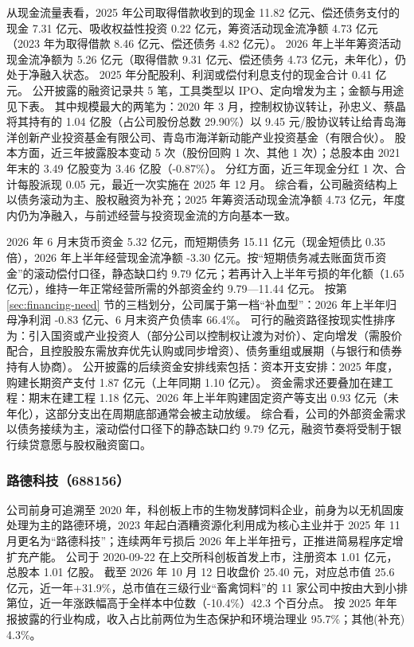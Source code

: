  从现金流量表看，2025 年公司取得借款收到的现金 11.82 亿元、偿还债务支付的现金 7.31 亿元、吸收权益性投资 0.22 亿元，筹资活动现金流净额 4.73 亿元（2023 年为取得借款 8.46 亿元、偿还债务 4.82 亿元）。 2026 年上半年筹资活动现金流净额为 5.26 亿元（取得借款 9.31 亿元、偿还债务 4.73 亿元，未年化），仍处于净融入状态。 2025 年分配股利、利润或偿付利息支付的现金合计 0.41 亿元。 公开披露的融资记录共 5 笔，工具类型以 IPO、定向增发为主；金额与用途见下表。 其中规模最大的两笔为：2020 年 3 月，控制权协议转让，孙忠义、蔡晶将其持有的 1.04 亿股（占公司股份总数 29.90\%）以 9.45 元/股协议转让给青岛海洋创新产业投资基金有限公司、青岛市海洋新动能产业投资基金（有限合伙）。 股本方面，近三年披露股本变动 5 次（股份回购 1 次、其他 1 次）；总股本由 2021 年末的 3.49 亿股变为 3.46 亿股（-0.87\%）。 分红方面，近三年现金分红 1 次、合计每股派现 0.05 元，最近一次实施在 2025 年 12 月。 综合看，公司融资结构上以债务滚动为主、股权融资为补充；2025 年筹资活动现金流净额 4.73 亿元，年度内仍为净融入，与前述经营与投资现金流的方向基本一致。

 2026 年 6 月末货币资金 5.32 亿元，而短期债务 15.11 亿元（现金短债比 0.35 倍），2026 年上半年经营现金流净额 -3.30 亿元。按“短期债务减去账面货币资金”的滚动偿付口径，静态缺口约 9.79 亿元；若再计入上半年亏损的年化额（1.65 亿元），维持一年正常经营所需的外部资金约 9.79---11.44 亿元。 按第 \ref{sec:financing-need} 节的三档划分，公司属于第一档“补血型”：2026 年上半年归母净利润 -0.83 亿元、6 月末资产负债率 66.4\%。 可行的融资路径按现实性排序为：引入国资或产业投资人（部分公司以控制权让渡为对价）、定向增发（需股价配合，且控股股东需放弃优先认购或同步增资）、债务重组或展期（与银行和债券持有人协商）。 公开披露的后续资金安排线索包括：资本开支安排：2025 年度，购建长期资产支付 1.87 亿元（上年同期 1.10 亿元）。 资金需求还要叠加在建工程：期末在建工程 1.18 亿元、2026 年上半年购建固定资产等支出 0.93 亿元（未年化），这部分支出在周期底部通常会被主动放缓。 综合看，公司的外部资金需求以债务接续为主，滚动偿付口径下的静态缺口约 9.79 亿元，融资节奏将受制于银行续贷意愿与股权融资窗口。




\subsubsection{路德科技（688156）}
\label{co:688156}

 公司前身可追溯至 2020 年，科创板上市的生物发酵饲料企业，前身为以无机固废处理为主的路德环境，2023 年起白酒糟资源化利用成为核心主业并于 2025 年 11 月更名为“路德科技”；连续两年亏损后 2026 年上半年扭亏，正推进简易程序定增扩充产能。 公司于 2020-09-22 在上交所科创板首发上市，注册资本 1.01 亿元，总股本 1.01 亿股。 截至 2026 年 10 月 12 日收盘价 25.40 元，对应总市值 25.6 亿元，近一年+31.9\%，总市值在三级行业“畜禽饲料”的 11 家公司中按由大到小排第位，近一年涨跌幅高于全样本中位数（-10.4\%）42.3 个百分点。 按 2025 年年报披露的行业构成，收入占比前两位为生态保护和环境治理业 95.7\%；其他(补充) 4.3\%。

